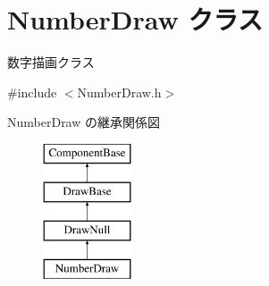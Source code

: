 \hypertarget{class_number_draw}{}\section{Number\+Draw クラス}
\label{class_number_draw}


数字描画クラス  




{\ttfamily \#include $<$Number\+Draw.\+h$>$}

Number\+Draw の継承関係図\begin{figure}[H]
\begin{center}
\leavevmode
\includegraphics[height=4.000000cm]{class_number_draw}
\end{center}
\end{figure}
